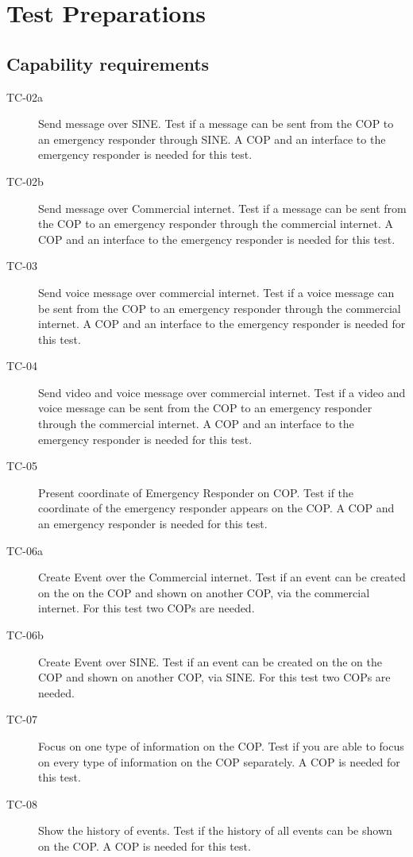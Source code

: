 %
\thispagestyle{fancy}
\chapter{Test Preparations}
\label{chp:test_prep}

\section{Capability requirements}
\begin{description}
	\item[TC-02a] Send message over SINE. Test if a message can be sent from the COP to an emergency responder through SINE. A COP and an interface to the emergency responder is needed for this test.
	\item[TC-02b] Send message over Commercial internet. Test if a message can be sent from the COP to an emergency responder through the commercial internet. A COP and an interface to the emergency responder is needed for this test.
	\item[TC-03] Send voice message over commercial internet. Test if a voice message can be sent from the COP to an emergency responder through the commercial internet. A COP and an interface to the emergency responder is needed for this test.
	\item[TC-04] Send video and voice message over commercial internet. Test if a video and voice message can be sent from the COP to an emergency responder through the commercial internet. A COP and an interface to the emergency responder is needed for this test.
	\item[TC-05] Present coordinate of Emergency Responder on COP. Test if the coordinate of the emergency responder appears on the COP. A COP and an emergency responder is needed for this test.
	\item[TC-06a] Create Event over the Commercial internet. Test if an event can be created on the on the COP and shown on another COP, via the commercial internet. For this test two COPs are needed.
	\item[TC-06b] Create Event over SINE. Test if an event can be created on the on the COP and shown on another COP, via SINE. For this test two COPs are needed.
	\item[TC-07] Focus on one type of information on the COP. Test if you are able to focus on every type of information on the COP separately. A COP is needed for this test.
	\item[TC-08] Show the history of events. Test if the history of all events can be shown on the COP. A COP is needed for this test.
\end{description}


